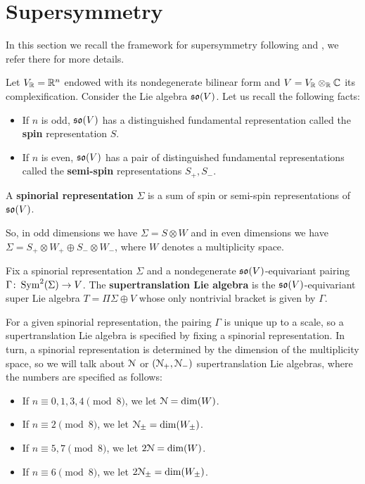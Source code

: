 \documentclass[10pt, oneside]{article}
\begin{document}
\section{Supersymmetry} \label{sec: susy}

In this section we recall the framework for supersymmetry following \cite{ElliottSafronov} and \cite{DeligneSpinors}, we refer there for more details.

Let $V_\mathbb R = \mathbb R^n$ endowed with its nondegenerate bilinear form and $V=V_\mathbb R\otimes_\mathbb R\mathbb C$ its complexification. Consider the Lie algebra $\mathfrak{so}(V)$. Let us recall the following facts:
\begin{itemize}
\item If $n$ is odd, $\mathfrak{so}(V)$ has a distinguished fundamental representation called the {\bf spin} representation $S$.

\item If $n$ is even, $\mathfrak{so}(V)$ has a pair of distinguished fundamental representations called the {\bf semi-spin} representations $S_+, S_-$.
\end{itemize}

\begin{dfn}
A {\bf spinorial representation} $\Sigma$ is a sum of spin or semi-spin representations of $\mathfrak{so}(V)$.
\end{dfn}

So, in odd dimensions we have $\Sigma=S\otimes W$ and in even dimensions we have $\Sigma=S_+\otimes W_+\oplus S_-\otimes W_-$, where $W$ denotes a multiplicity space.

\begin{dfn}
Fix a spinorial representation $\Sigma$ and a nondegenerate $\mathfrak{so}(V)$-equivariant pairing $\Gamma\colon \operatorname{Sym}^2(\Sigma)\rightarrow V$. The {\bf supertranslation Lie algebra} is the $\mathfrak{so}(V)$-equivariant super Lie algebra $T=\Pi\Sigma\oplus V$ whose only nontrivial bracket is given by $\Gamma$.
\end{dfn}

For a given spinorial representation, the pairing $\Gamma$ is unique up to a scale, so a supertranslation Lie algebra is specified by fixing a spinorial representation. In turn, a spinorial representation is determined by the dimension of the multiplicity space, so we will talk about $\mathcal{N}$ or $(\mathcal{N}_+, \mathcal{N}_-)$ supertranslation Lie algebras, where the numbers are specified as follows:
\begin{itemize}
\item If $n\equiv 0, 1, 3, 4\pmod 8$, we let $\mathcal{N} = \dim(W)$.

\item If $n\equiv 2 \pmod 8$, we let $\mathcal{N}_{\pm}=\dim(W_{\pm})$.

\item If $n\equiv 5, 7\pmod 8$, we let $2\mathcal{N} = \dim(W)$.

\item If $n\equiv 6\pmod 8$, we let $2\mathcal{N}_{\pm} = \dim(W_{\pm})$.
\end{itemize}
\end{document}
